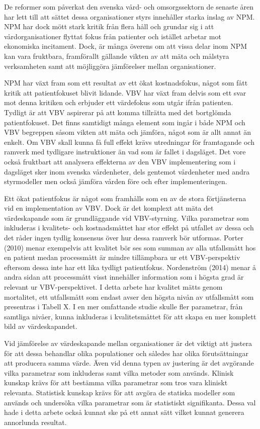 De reformer som påverkat den svenska vård- och omsorgssektorn de senaste åren har lett till att sättet dessa organisationer styrs innehåller starka inslag av NPM. NPM har dock mött stark kritik från flera håll och grundar sig i att vårdorganisationer flyttat fokus från patienter och istället arbetar mot ekonomiska incitament. Dock, är många överens om att vissa delar inom NPM kan vara fruktbara, framförallt gällande vikten av att mäta och målstyra verksamheten samt att möjliggöra jämförelser mellan organisationer.

NPM har växt fram som ett resultat av ett ökat kostnadsfokus, något som fått kritik att patientfokuset blivit lidande. VBV har växt fram delvis som ett svar mot denna kritiken och erbjuder ett värdefokus som utgår ifrån patienten. Tydligt är att VBV aspirerar på att komma tillrätta med det bortglömda patientfokuset. Det finns samtidigt många element som ingår i både NPM och VBV begreppen såsom vikten att mäta och jämföra, något som är allt annat än enkelt. Om VBV skall kunna få full effekt krävs utredningar för framtagande och ramverk med tydligare instruktioner än vad som är fallet i dagsläget. Det vore också fruktbart att analysera effekterna av den VBV implementering som i dagsläget sker inom svenska vårdenheter, dels gentemot vårdenheter med andra styrmodeller men också jämföra vården före och efter implementeringen.

Ett ökat patientfokus är något som framhålls som en av de stora förtjänsterna vid en implementation av VBV. Dock är det komplext att mäta det värdeskapande som är grundläggande vid VBV-styrning. Vilka parametrar som inkluderas i kvalitets- och kostnadsmåttet har stor effekt på utfallet av dessa och det råder ingen tydlig konsensus över hur dessa ramverk bör utformas. Porter (2010) menar exempelvis att kvalitet bör ses som summan av alla utfallsmått hos en patient medan processmått är mindre tillämpbara ur ett VBV-perspektiv eftersom dessa inte har ett lika tydligt patientfokus. Nordenström (2014) menar å andra sidan att processmått visst innehåller information som i högsta grad är relevant ur VBV-perspektivet. I detta arbete har kvalitet mätts genom mortalitet, ett utfallsmått som endast avser den högsta nivån av utfallsmått som presentras i Tabell X. I en mer omfattande studie skulle fler parametrar, från samtliga nivåer, kunna inkluderas i kvalitetsmåttet för att skapa en mer komplett bild av värdeskapandet.

Vid jämförelse av värdeskapande mellan organisationer är det viktigt att justera för att dessa behandlar olika populationer och således har olika förutsättningar att producera samma värde. Även vid denna typen av justering är det avgörande vilka parametrar som inkluderas samt vilka metoder som används. Klinisk kunskap krävs för att bestämma vilka parametrar som tros vara kliniskt relevanta. Statistisk kunskap krävs för att avgöra de statiska modeller som används och undersöka vilka parametrar som är statistiskt signifikanta. Dessa val hade i detta arbete också kunnat ske på ett annat sätt vilket kunnat generera annorlunda resultat.

